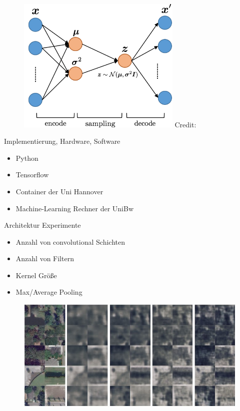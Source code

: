 \begin{frame}
	\begin{figure}
		\includegraphics[width=0.7\textwidth]{images/figures/presentation/variational_autoencoder.png}
		\vspace*{15pt}\hbox{\scriptsize Credit:}
	\end{figure}
\end{frame}

\begin{frame}{Implementierung, Hardware, Software}
	\begin{itemize}
		\item Python
		\item Tensorflow
		\item Container der Uni Hannover
		\item Machine-Learning Rechner der UniBw
	\end{itemize}
\end{frame}

\begin{frame}{Architektur Experimente}
	\begin{itemize}
		\item Anzahl von convolutional Schichten
		\item Anzahl von Filtern
		\item Kernel Größe
		\item Max/Average Pooling
	\end{itemize}
\end{frame}

\begin{frame}
	\begin{figure}
		\includegraphics[width=\textwidth]{images/figures/presentation/bad_reconstructions.jpg}
	\end{figure} 
\end{frame}

